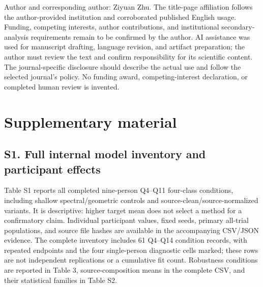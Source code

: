 \documentclass[11pt]{article}
\begin{document}
Author and corresponding author: Ziyuan Zhu. The title-page affiliation follows the author-provided institution and corroborated published English usage. Funding, competing interests, author contributions, and institutional secondary-analysis requirements remain to be confirmed by the author. AI assistance was used for manuscript drafting, language revision, and artifact preparation; the author must review the text and confirm responsibility for its scientific content. The journal-specific disclosure should describe the actual use and follow the selected journal's policy. No funding award, competing-interest declaration, or completed human review is invented.

\section*{Supplementary material}
\subsection*{S1. Full internal model inventory and participant effects}
Table S1 reports all completed nine-person Q4--Q11 four-class conditions, including shallow spectral/geometric controls and source-clean/source-normalized variants. It is descriptive: higher target mean does not select a method for a confirmatory claim. Individual participant values, fixed seeds, primary all-trial populations, and source file hashes are available in the accompanying CSV/JSON evidence. The complete inventory includes 61 Q4--Q14 condition records, with repeated endpoints and the four single-person diagnostic cells marked; these rows are not independent replications or a cumulative fit count. Robustness conditions are reported in Table 3, source-composition means in the complete CSV, and their statistical families in Table S2.
\end{document}
